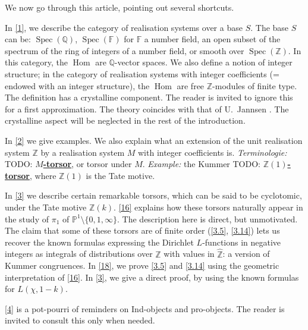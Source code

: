 \documentclass{article}
\theoremstyle{definition}
\newcommand{\bb}{\mathbb}
\newcommand{\PP}{\bb{P}}
\newcommand{\ZZ}{\bb{Z}}
\newcommand{\hZZ}{\widehat{\bb{Z}}}
\newcommand{\FF}{\bb{F}}
\newcommand{\QQ}{\bb{Q}}
\DeclareMathOperator{\Spec}{Spec}
\DeclareMathOperator{\Hom}{Hom}
\newcommand{\unsure}[1]{TODO: \underline{\textbf{#1}}}
\newcommand{\oldpage}[1]{\marginpar{\footnotesize$\Big\vert$ \textit{p.~#1}}}
\begin{document}
We now go through this article, pointing out several shortcuts.

In \cref{1}, we describe the category of realisation systems over a base $S$.
The base $S$ can be: $\Spec(\QQ)$, $\Spec(\FF)$ for $\FF$ a number field, an open subset of the spectrum of the ring of integers of a number field, or smooth over $\Spec(\ZZ)$.
In this category, the $\Hom$ are $\QQ$-vector spaces.
We also define a notion of integer structure;
in the category of realisation systems with integer coefficients (= endowed with an integer structure), the $\Hom$ are free $\ZZ$-modules of finite type.
The definition has a crystalline component.
The reader is invited to ignore this for a first approximation.
The theory coincides with that of U.~Jannsen
\oldpage{84}
\cite{J}.
The crystalline aspect will be neglected in the rest of the introduction.

In \cref{2} we give examples.
We also explain what an extension of the unit realisation system $\ZZ$ by a realisation system $M$ with integer coefficients is.
\emph{Terminologie:} \unsure{$M$-torsor}, or torsor under $M$.
\emph{Example:} the Kummer \unsure{$\ZZ(1)$-torsor}, where $\ZZ(1)$ is the Tate motive.

In \cref{3} we describe certain remarkable torsors, which can be said to be cyclotomic, under the Tate motive $\ZZ(k)$.
\cref{16} explains how these torsors naturally appear in the study of $\pi_1$ of $\PP^1\setminus\{0,1,\infty\}$.
The description here is direct, but unmotivated.
The claim that some of these torsors are of finite order (\cref{3.5}, \cref{3.14}) lets us recover the known formulas expressing the Dirichlet $L$-functions in negative integers as integrals of distributions over $\hZZ$ with values in $\hZZ$: a version of Kummer congruences.
In \cref{18}, we prove \cref{3.5} and \cref{3.14} using the geometric interpretation of \cref{16}.
In \cref{3}, we give a direct proof, by using the known formulas for $L(\chi,1-k)$.

\cref{4} is a pot-pourri of reminders on Ind-objects and pro-objects.
The reader is invited to consult this only when needed.
\end{document}
